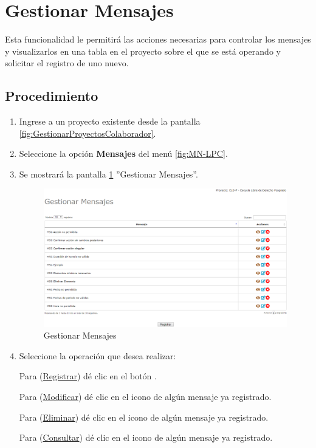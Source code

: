 \hypertarget{cv:GestionarGlosario}{\section{Gestionar Mensajes}} \label{sec:GestionarMensajes}

	Esta funcionalidad le permitirá las acciones necesarias para controlar los mensajes y visualizarlos en una tabla en el proyecto sobre el que se está operando y solicitar el registro de uno nuevo.

		\subsection{Procedimiento}

			\begin{enumerate}
				
			\item Ingrese a un proyecto existente desde la pantalla \ref{fig:GestionarProyectosColaborador}.
	
			\item Seleccione la opción \textbf{Mensajes} del menú \ref{fig:MN-LPC}.
	
			\item Se mostrará la pantalla \ref{fig:GestionarMensajes} ''Gestionar Mensajes''.

			\begin{figure}[h!]
				\begin{center}
					\includegraphics[scale=0.5]{roles/lider/mensajes/pantallas/IU9gestionarMensajes}
					\caption{Gestionar Mensajes}
					\label{fig:GestionarMensajes}
				\end{center}
			\end{figure}
		
				\item Seleccione la operación que desea realizar:
			
			Para (\hyperlink{cv:registrarMensaje}{Registrar}) dé clic en el botón \IURegistrar.
			
			Para (\hyperlink{cv:modificarMensaje}{Modificar}) dé clic en el icono \IUEditar{} de algún mensaje ya registrado.
			
			Para (\hyperlink{cv:eliminarMensaje}{Eliminar}) dé clic en el icono \IUBotonEliminar{} de algún mensaje ya registrado.
			
			Para (\hyperlink{cv:consultarTermino}{Consultar}) dé clic en el icono \IUConsultar{} de algún mensaje ya registrado.
			\end{enumerate}